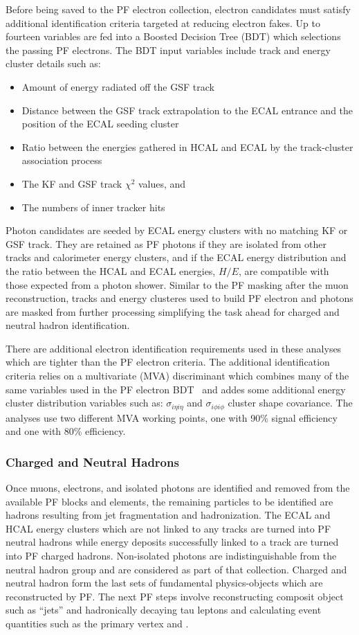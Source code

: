 Before being saved to the PF electron collection, electron candidates must satisfy additional
identification criteria targeted at reducing electron fakes. Up to fourteen variables are
fed into a Boosted Decision Tree (BDT) which selections the passing PF electrons. The BDT
input variables include track and energy cluster details such as:
\begin{itemize}
\item Amount of energy radiated off the GSF track
\item Distance between the GSF track extrapolation to the ECAL entrance and the position of the ECAL seeding cluster
\item Ratio between the energies gathered in HCAL and ECAL by the track-cluster association process
\item The KF and GSF track $\chi^2$ values, and
\item The numbers of inner tracker hits
\end{itemize}

Photon candidates are seeded by ECAL energy clusters with no matching KF or GSF track.
They are retained as PF photons if they are isolated from other tracks and calorimeter energy clusters, 
and if the ECAL energy distribution and the ratio between the HCAL and ECAL energies, $H/E$, are 
compatible with those expected from a photon shower. Similar to the PF masking after the muon 
reconstruction, tracks and energy clusteres used to
build PF electron and photons are masked from further processing simplifying the task ahead
for charged and neutral hadron identification.

There are additional electron identification requirements used in these analyses which are tighter
than the PF electron criteria. The additional identification criteria relies on a multivariate (MVA) discriminant
which combines many of the same variables used in the PF electron BDT~\cite{Khachatryan:2015hwa} 
and addes some additional energy cluster distribution variables such as: $\sigma_{i\eta i\eta}$ and
$\sigma_{i\phi i\phi}$ cluster shape covariance. The analyses use
two different MVA working points, one with 90\% signal efficiency and one with 80\% efficiency.


\subsubsection{Charged and Neutral Hadrons}
Once muons, electrons, and isolated photons are identified and removed from the available PF blocks
and elements, the remaining particles to be identified are hadrons resulting from jet fragmentation and 
hadronization. The ECAL and HCAL energy clusters which are not linked to any tracks are turned into
PF neutral hadrons while energy deposits successfully linked to a track are turned into PF charged
hadrons. Non-isolated photons are indistinguishable from the neutral hadron group and are considered
as part of that collection. Charged and neutral hadron form the last sets of fundamental physics-objects
which are reconstructed by PF. The next PF steps involve reconstructing composit object such as ``jets''
and hadronically decaying tau leptons and calculating event quantities such as the primary vertex and
\etvecmiss.


